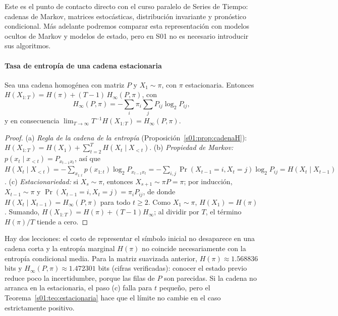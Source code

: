 \begin{puente}
Este es el punto de contacto directo con el curso paralelo de Series
de Tiempo: cadenas de Markov, matrices estocásticas, distribución invariante
y pronóstico condicional. Más adelante podremos comparar esta representación
con modelos ocultos de Markov y modelos de estado, pero en S01 no es
necesario introducir sus algoritmos.
\end{puente}

\paragraph{Tasa de entropía de una cadena estacionaria}
\begin{proposicion}\label{s01:prop:tasa}
Sea una cadena homogénea con matriz $P$ y $X_1\sim\pi$, con $\pi$ estacionaria.
Entonces $H(X_{1:T})=H(\pi)+(T-1)\,H_\infty(P,\pi)$, con
\[
H_\infty(P,\pi)=-\sum_{i}\pi_i\sum_{j}P_{ij}\log_2P_{ij},
\]
y en consecuencia $\lim_{T\to\infty}T^{-1}H(X_{1:T})=H_\infty(P,\pi)$.
\end{proposicion}
\begin{proof}
(a) \emph{Regla de la cadena de la entropía} (Proposición~\ref{s01:prop:cadenaH}):
$H(X_{1:T})=H(X_1)+\sum_{t=2}^TH(X_t\mid X_{<t})$.
(b) \emph{Propiedad de Markov:} $p(x_t\mid x_{<t})=P_{x_{t-1}x_t}$, así que
$H(X_t\mid X_{<t})=-\sum_{x_{1:t}}p(x_{1:t})\log_2P_{x_{t-1}x_t}
=-\sum_{i,j}\Pr(X_{t-1}=i,X_t=j)\log_2P_{ij}=H(X_t\mid X_{t-1})$.
(c) \emph{Estacionariedad:} si $X_s\sim\pi$, entonces $X_{s+1}\sim\pi P=\pi$; por
inducción, $X_{t-1}\sim\pi$ y $\Pr(X_{t-1}=i,X_t=j)=\pi_iP_{ij}$, de donde
$H(X_t\mid X_{t-1})=H_\infty(P,\pi)$ para todo $t\ge2$.
Como $X_1\sim\pi$, $H(X_1)=H(\pi)$. Sumando,
$H(X_{1:T})=H(\pi)+(T-1)H_\infty$; al dividir por $T$, el término $H(\pi)/T$
tiende a cero.
\end{proof}
\noindent Hay dos lecciones: el costo de representar el símbolo inicial
no desaparece en una cadena corta y la entropía marginal $H(\pi)$
no coincide necesariamente con la entropía condicional media. Para la matriz
suavizada anterior, $H(\pi)\approx1.568836$ bits y
$H_\infty(P,\pi)\approx1.472301$ bits (cifras verificadas): conocer el estado
previo reduce poco la incertidumbre, porque las filas de $P$ son parecidas.
Si la cadena no arranca en la estacionaria, el paso (c) falla para $t$ pequeño,
pero el Teorema~\ref{s01:teo:estacionaria} hace que el límite no cambie en el caso
estrictamente positivo.

